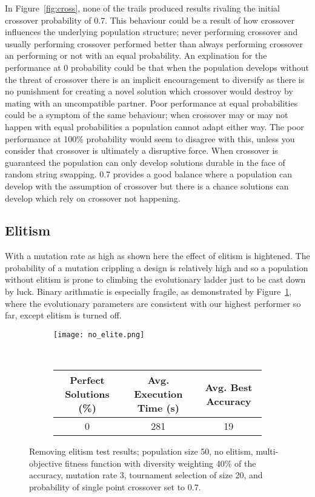 In Figure~\ref{fig:cross}, none of the trails produced results rivaling the
initial crossover probability
of 0.7. This behaviour could be a result of how crossover influences the underlying
population structure; never performing crossover and usually performing crossover
performed better than always performing crossover an performing or not with an equal
probability. An explination for the performance at 0 probability could be that
when the population develops without the threat of crossover there is an implicit
encouragement to diversify as there is no punishment for creating a novel solution
which crossover would destroy by mating with an uncompatible partner. Poor performance
at equal probabilities could be a symptom of the same behaviour; when crossover
may or may not happen with equal probabilities a population cannot adapt either way.
The poor performance at 100\% probability would seem to disagree with this, unless you
consider that crossover is ultimately a disruptive force. When crossover is guaranteed
the population can only develop solutions durable in the face of random string swapping.
0.7 provides a good balance where a population can develop with the assumption of
crossover but there is a chance solutions can develop which rely on crossover not
happening.

\subsection{Elitism \label{ss:elitism}}
With a mutation rate as high as shown here the effect of elitism is hightened.
The probability of a mutation crippling a design is relatively high and so a population
without elitism is prone to climbing the evolutionary ladder just to be cast
down by luck. Binary arithmatic is especially fragile, as demonstrated by Figure~\ref{fig:no_elitism},
where the evolutionary parameters are consistent with our highest performer so far, except
elitism is turned off.

\begin{figure}
	\centering
	\begin{subfigure}[ht]{0.49\textwidth}
		\texttt{[image: no\_elite.png]}
		\vspace{1em}
	\end{subfigure}
	~
	\begin{subfigure}[ht]{\textwidth}
		\centering
		\begin{tabular}{ccc}
			\toprule
			\bfseries{Perfect Solutions (\%)} &
			\bfseries{Avg. Execution Time (s)} & \bfseries{Avg. Best Accuracy}\\
			\midrule
			0 & 281 & 19\\
			\bottomrule
		\end{tabular}
	\end{subfigure}

	\caption[Removing elitism test results]{Removing elitism test results;
	population size 50, no elitism, multi-objective fitness function with
	diversity weighting 40\% of the accuracy, mutation rate 3, tournament
	selection of size 20, and probability of single point crossover set to 0.7.}
	\label{fig:no_elitism}
\end{figure}


